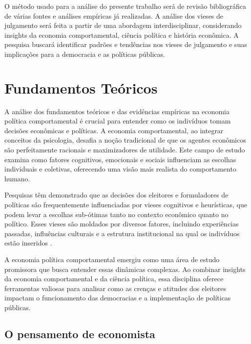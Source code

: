 O método usado para a análise do presente trabalho será de revisão bibliográfica de várias fontes e análises empíricas já realizadas. A análise dos vieses de julgamento será feita a partir de uma abordagem interdisciplinar, considerando insights da economia comportamental, ciência política e história econômica. A pesquisa buscará identificar padrões e tendências nos vieses de julgamento e suas implicações para a democracia e as políticas públicas.

\section{Fundamentos Teóricos }

A análise dos fundamentos teóricos e das evidências empíricas na economia política comportamental é crucial para entender como os indivíduos tomam decisões econômicas e políticas. A economia comportamental, ao integrar conceitos da psicologia, desafia a noção tradicional de que os agentes econômicos são perfeitamente racionais e maximizadores de utilidade. Este campo de estudo examina como fatores cognitivos, emocionais e sociais influenciam as escolhas individuais e coletivas, oferecendo uma visão mais realista do comportamento humano.

Pesquisas têm demonstrado que as decisões dos eleitores e formuladores de políticas são frequentemente influenciadas por vieses cognitivos e heurísticas, que podem levar a escolhas sub-ótimas tanto no contexto econômico quanto no político. Esses vieses são moldados por diversos fatores, incluindo experiências passadas, influências culturais e a estrutura institucional na qual os indivíduos estão inseridos \cite{The_Myth_of_the_Rational_Voter, Systematically_Biased_Beliefs_about_Economics, saee1996}. 

A economia política comportamental emergiu como uma área de estudo promissora que busca entender essas dinâmicas complexas. Ao combinar insights da economia comportamental e da ciência política, essa disciplina oferece ferramentas valiosas para analisar como as crenças e atitudes dos eleitores impactam o funcionamento das democracias e a implementação de políticas públicas.


\subsection{O pensamento de economista} 


